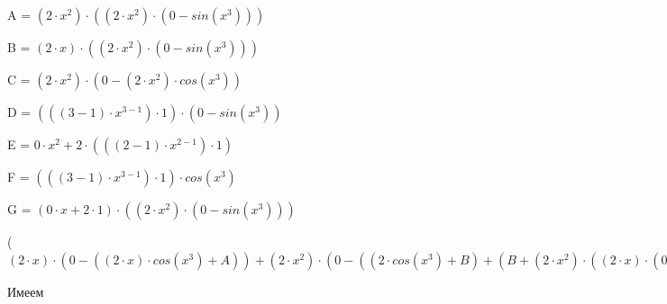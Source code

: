 \documentclass[12pt,a4paper,fleqn]{article}
\begin{document}
\begin{center}
A = $(2 \cdot x^{2}) \cdot ((2 \cdot x^{2}) \cdot (0-sin(x^{3})))$\end{center}
\begin{center}
B = $(2 \cdot x) \cdot ((2 \cdot x^{2}) \cdot (0-sin(x^{3})))$\end{center}
\begin{center}
C = $(2 \cdot x^{2}) \cdot (0-(2 \cdot x^{2}) \cdot cos(x^{3}))$\end{center}
\begin{center}
D = $(((3-1) \cdot x^{3-1}) \cdot 1) \cdot (0-sin(x^{3}))$\end{center}
\begin{center}
E = $0 \cdot x^{2}+2 \cdot (((2-1) \cdot x^{2-1}) \cdot 1)$\end{center}
\begin{center}
F = $(((3-1) \cdot x^{3-1}) \cdot 1) \cdot cos(x^{3})$\end{center}
\begin{center}
G = $(0 \cdot x+2 \cdot 1) \cdot ((2 \cdot x^{2}) \cdot (0-sin(x^{3})))$\end{center}
\begin{center}
 ($(2 \cdot x) \cdot (0-((2 \cdot x) \cdot cos(x^{3})+A))+(2 \cdot x^{2}) \cdot (0-((2 \cdot cos(x^{3})+B)+(B+(2 \cdot x^{2}) \cdot ((2 \cdot x) \cdot (0-sin(x^{3}))+C)))))'
  = ((0 \cdot x+2 \cdot 1) \cdot (0-((2 \cdot x) \cdot cos(x^{3})+A))+(2 \cdot x) \cdot (0-(((0 \cdot x+2 \cdot 1) \cdot cos(x^{3})+(2 \cdot x) \cdot (D))+((E) \cdot ((2 \cdot x^{2}) \cdot (0-sin(x^{3})))+(2 \cdot x^{2}) \cdot ((E) \cdot (0-sin(x^{3}))+(2 \cdot x^{2}) \cdot (0-F))))))+((E) \cdot (0-((2 \cdot cos(x^{3})+B)+(B+(2 \cdot x^{2}) \cdot ((2 \cdot x) \cdot (0-sin(x^{3}))+C))))+(2 \cdot x^{2}) \cdot (0-(((0 \cdot cos(x^{3})+2 \cdot (D))+(G+(2 \cdot x) \cdot ((E) \cdot (0-sin(x^{3}))+(2 \cdot x^{2}) \cdot (0-F))))+((G+(2 \cdot x) \cdot ((E) \cdot (0-sin(x^{3}))+(2 \cdot x^{2}) \cdot (0-F)))+((E) \cdot ((2 \cdot x) \cdot (0-sin(x^{3}))+C)+(2 \cdot x^{2}) \cdot (((0 \cdot x+2 \cdot 1) \cdot (0-sin(x^{3}))+(2 \cdot x) \cdot (0-F))+((E) \cdot (0-(2 \cdot x^{2}) \cdot cos(x^{3}))+(2 \cdot x^{2}) \cdot (0-((E) \cdot cos(x^{3})+(2 \cdot x^{2}) \cdot (D))))))))))$\end{center}
Имеем
\end{document}
